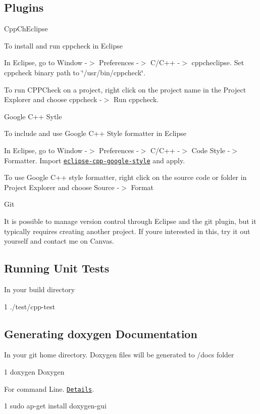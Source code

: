 \subsection*{Plugins}


\begin{DoxyItemize}
\item Cpp\+Ch\+Eclipse

To install and run cppcheck in Eclipse
\begin{DoxyEnumerate}
\item In Eclipse, go to Window -\/$>$ Preferences -\/$>$ C/\+C++ -\/$>$ cppcheclipse. Set cppcheck binary path to \char`\"{}/usr/bin/cppcheck\char`\"{}.
\item To run C\+P\+P\+Check on a project, right click on the project name in the Project Explorer and choose cppcheck -\/$>$ Run cppcheck.
\end{DoxyEnumerate}
\item Google C++ Sytle

To include and use Google C++ Style formatter in Eclipse
\begin{DoxyEnumerate}
\item In Eclipse, go to Window -\/$>$ Preferences -\/$>$ C/\+C++ -\/$>$ Code Style -\/$>$ Formatter. Import \href{https://raw.githubusercontent.com/google/styleguide/gh-pages/eclipse-cpp-google-style.xml}{\tt eclipse-\/cpp-\/google-\/style} and apply.
\item To use Google C++ style formatter, right click on the source code or folder in Project Explorer and choose Source -\/$>$ Format
\end{DoxyEnumerate}
\item Git

It is possible to manage version control through Eclipse and the git plugin, but it typically requires creating another project. If you\textquotesingle{}re interested in this, try it out yourself and contact me on Canvas.
\end{DoxyItemize}

\subsection*{Running Unit Tests}

In your build directory 
\begin{DoxyCode}
1 ./test/cpp-test
\end{DoxyCode}


\subsection*{Generating doxygen Documentation}

In your git home directory. Doxygen files will be generated to /docs folder 
\begin{DoxyCode}
1 doxygen Doxygen
\end{DoxyCode}
 For command Line. \href{https://www.stack.nl/~dimitri/doxygen/manual/doxywizard_usage.html}{\tt Details}. 
\begin{DoxyCode}
1 sudo ap-get install doxygen-gui
\end{DoxyCode}
 